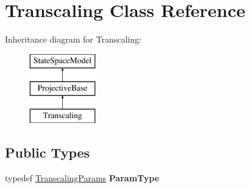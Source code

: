 \hypertarget{classTranscaling}{\section{Transcaling Class Reference}
\label{classTranscaling}
}
Inheritance diagram for Transcaling\-:\begin{figure}[H]
\begin{center}
\leavevmode
\includegraphics[height=3.000000cm]{classTranscaling}
\end{center}
\end{figure}
\subsection*{Public Types}
\begin{DoxyCompactItemize}
\item 
\hypertarget{classTranscaling_a817035c2802317c15a2e6a6d2be2bf51}{typedef \hyperlink{structTranscalingParams}{Transcaling\-Params} {\bfseries Param\-Type}}\label{classTranscaling_a817035c2802317c15a2e6a6d2be2bf51}

\end{DoxyCompactItemize}
